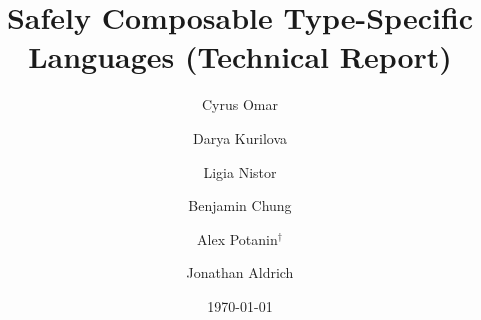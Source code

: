 \documentclass[12pt]{article}
\title{Safely Composable Type-Specific Languages (Technical Report)}
\author{Cyrus Omar \and Darya Kurilova \and Ligia Nistor \and Benjamin Chung \and Alex Potanin$^{\dag}$ \and Jonathan Aldrich}
\date{\today}
\begin{document}
\renewcommand*{\thepage}{title-\arabic{page}} 
\maketitle
\renewcommand*{\thepage}{\arabic{page}} 
\appendix



\FloatBarrier


\end{document}
